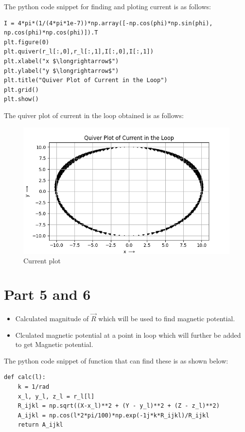 \documentclass[11pt, a4paper]{article}
\begin{document}
The python code snippet for finding and ploting current is as follows:
\begin{verbatim}	
I = 4*pi*(1/(4*pi*1e-7))*np.array([-np.cos(phi)*np.sin(phi), np.cos(phi)*np.cos(phi)]).T
plt.figure(0)
plt.quiver(r_l[:,0],r_l[:,1],I[:,0],I[:,1])
plt.xlabel("x $\longrightarrow$")
plt.ylabel("y $\longrightarrow$")
plt.title("Quiver Plot of Current in the Loop")
plt.grid()
plt.show()
\end{verbatim}

The quiver plot of current in the loop obtained is as follows:   
	\begin{figure}[!tbh]
   	\centering
   	\includegraphics[scale=0.9]{Figure_0.png}   
   	\caption{Current plot}
   	\label{fig:sample}
   \end{figure} 
  
\section*{Part 5 and 6}
\begin{itemize}
\item Calculated magnitude of $\vec{R}$ which will be used to find magnetic potential.
\item Clculated magnetic potential at a point in loop which will further be added to get Magnetic potential.
\end{itemize}
The python code snippet of function that can find these is as shown below:
\begin{verbatim}	
def calc(l):
    k = 1/rad
    x_l, y_l, z_l = r_l[l]
    R_ijkl = np.sqrt((X-x_l)**2 + (Y - y_l)**2 + (Z - z_l)**2)
    A_ijkl = np.cos(l*2*pi/100)*np.exp(-1j*k*R_ijkl)/R_ijkl
    return A_ijkl	
\end{verbatim} 
\end{document}
